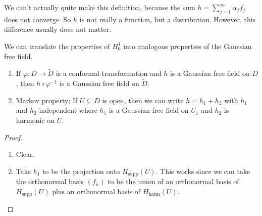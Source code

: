 \documentclass[a4paper]{article}
\begin{document}
We can't actually quite make this definition, because the sum $h = \sum_{j = 1}^\infty \alpha_j f_j$ does not converge. So $h$ is not really a function, but a distribution. However, this difference usually does not matter.

We can translate the properties of $H_0^1$ into analogous properties of the Gaussian free field.
\begin{prop}\leavevmode
  \begin{enumerate}
    \item If $\varphi: D \to \tilde{D}$ is a conformal transformation and $h$ is a Gaussian free field on $D$, then $h \circ \varphi^{-1}$ is a Gaussian free field on $\tilde{D}$.
    \item Markov property: If $U \subseteq D$ is open, then we can write $h = h_1 + h_2$ with $h_1$ and $h_2$ independent where $h_1$ is a Gaussian free field on $U_1$ and $h_2$ is harmonic on $U$.
  \end{enumerate}
\end{prop}

\begin{proof}\leavevmode
  \begin{enumerate}
    \item Clear.
    \item Take $h_1$ to be the projection onto $H_{\mathrm{supp}}(U)$. This works since we can take the orthonormal basis $(f_n)$ to be the union of an orthonormal basis of $H_{\mathrm{supp}}(U)$ plus an orthonormal basis of $H_{\mathrm{harm}}(U)$.\qedhere
  \end{enumerate}
\end{proof}
\end{document}
